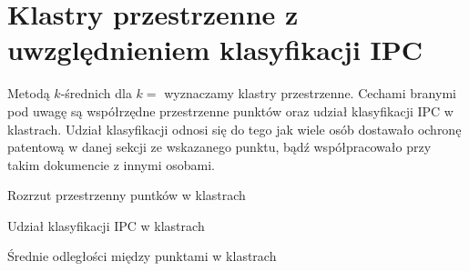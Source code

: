 \section{Klastry przestrzenne z uwzględnieniem klasyfikacji \ac{IPC}}

Metodą $k$-średnich dla $k=$ wyznaczamy klastry przestrzenne. 
Cechami branymi pod uwagę są współrzędne przestrzenne punktów oraz
udział klasyfikacji \ac{IPC} w klastrach. Udział klasyfikacji
odnosi się do tego jak wiele osób dostawało ochronę patentową
w danej sekcji ze wskazanego punktu, bądź współpracowało przy
takim dokumencie z innymi osobami.

\begin{multicols}{2}

{Rozrzut przestrzenny puntków w klastrach}

\columnbreak

{Udział klasyfikacji \ac{IPC} w klastrach}

{Średnie odległości między punktami w klastrach}

\end{multicols}